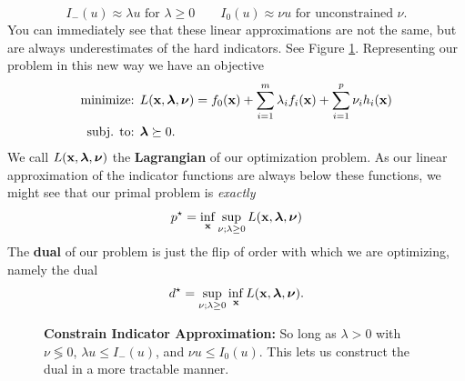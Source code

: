 \documentclass{article}
\begin{document}
\[
    I_-(u) \approx \lambda u\text{ for $\lambda \geq 0$} \qquad I_0(u) \approx \nu u \text{ for unconstrained $\nu$}.
\]
You can immediately see that these linear approximations are not the same, but are
always underestimates of the hard indicators. See Figure \ref{fig:dual-vars}.
Representing our problem in this new way we have an objective
\begin{align*}
    \text{minimize: } & L({\bf x},\hbox{\boldmath$\lambda$}, \hbox{\boldmath$\nu$}) = f_0({\bf x}) + \sum_{i=1}^m \lambda_i f_i({\bf x}) + \sum_{i=1}^p \nu_i h_i({\bf x})\\
    \text{subj. to: } & \hbox{\boldmath$\lambda$} \succeq 0.
\end{align*}
We call $L({\bf x},\hbox{\boldmath$\lambda$}, \hbox{\boldmath$\nu$})$ the \textbf{Lagrangian} of our optimization problem.
As our linear approximation of the indicator functions are always below these functions,
we might see that our primal problem is \textit{exactly}
\[
    p^\star = \inf_{\bf x} \sup_{\nu; \lambda \geq 0} L({\bf x},\hbox{\boldmath$\lambda$},\hbox{\boldmath$\nu$})
\]
The \textbf{dual} of our problem is just the flip of order with which we are
optimizing, namely the dual
\[
    d^\star = \sup_{\nu; \lambda \geq 0} \inf_{\bf x} L({\bf x},\hbox{\boldmath$\lambda$},\hbox{\boldmath$\nu$}).
\]

\begin{figure}
    \centering
    \begin{center}
    \end{center}
    \caption{\textbf{Constrain Indicator Approximation:} So long as $\lambda > 0$ with $\nu \lessgtr 0$,
    $\lambda u \leq I_-(u)$, and $\nu u \leq I_0(u)$. This lets us construct the
    dual in a more tractable manner.}
    \label{fig:dual-vars}
\end{figure}
\end{document}
